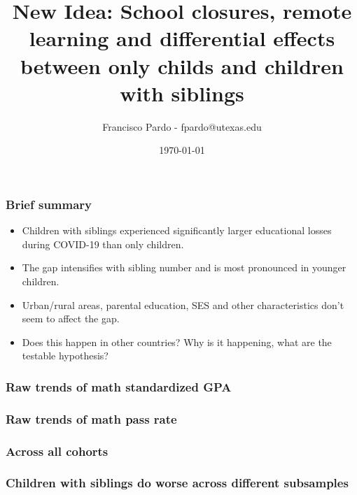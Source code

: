 \documentclass{beamer}
\title[]{New Idea: School closures, remote learning and differential effects between only childs and children with siblings}
\author[Francisco Pardo] %
{Francisco Pardo - fpardo@utexas.edu \inst{1}}
\institute[UT] %
{
  \inst{1}%
  University of Texas at Austin
}
\date{\today}
\begin{document}
\frame{\titlepage}



\begin{frame}
    \frametitle{Brief summary}
    \begin{itemize}
        \item Children with siblings experienced significantly larger educational losses during COVID-19 than only children.
        \item The gap intensifies with sibling number and is most pronounced in younger children.
        \item Urban/rural areas, parental education, SES and other characteristics don't seem to affect the gap.
        \item Does this happen in other countries? Why is it happening, what are the testable hypothesis?
        \end{itemize}
\end{frame}



\begin{frame}
    \label{raw}
    \frametitle{Raw trends of math standardized GPA}
        {
  }  
\end{frame}


\begin{frame}
    \label{raw}
    \frametitle{Raw trends of math pass rate}
        {
  }  
\end{frame}

\begin{frame}
    \label{raw}
    \frametitle{Across all cohorts}
        {
  }  
\end{frame}



\begin{frame}
    \label{raw}
    \frametitle{Children with siblings do worse across different subsamples}
        {
  }  
\end{frame}
\end{document}
